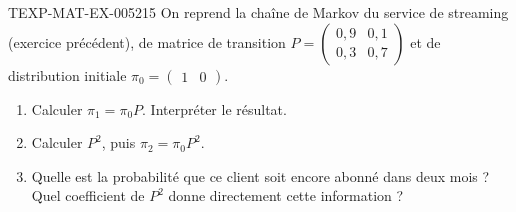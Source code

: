 \begin{exercice}{TEXP-MAT-EX-005}{2}{15}
On reprend la chaîne de Markov du service de streaming (exercice précédent), de matrice de transition $P=\begin{pmatrix}0{,}9&0{,}1\\0{,}3&0{,}7\end{pmatrix}$ et de distribution initiale $\pi_0=\begin{pmatrix}1&0\end{pmatrix}$.
\begin{enumerate}
  \item Calculer $\pi_1=\pi_0P$. Interpréter le résultat.
  \item Calculer $P^2$, puis $\pi_2=\pi_0P^2$.
  \item Quelle est la probabilité que ce client soit encore abonné dans deux mois ? Quel coefficient de $P^2$ donne directement cette information ?
\end{enumerate}
\end{exercice}
